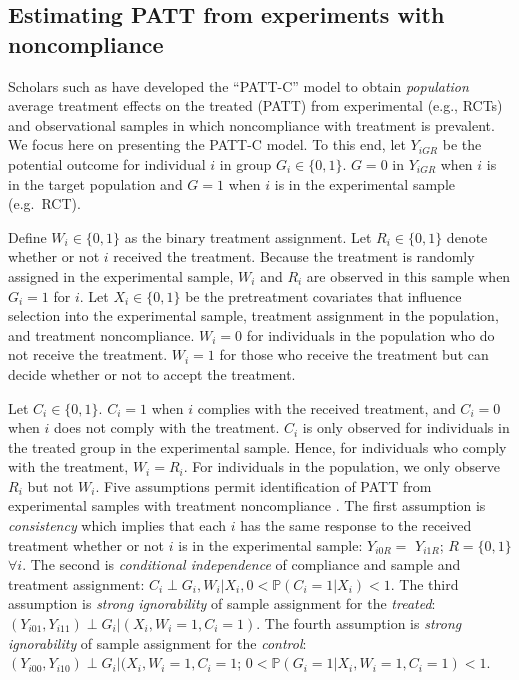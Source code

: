 \subsection{Estimating PATT from experiments with noncompliance}\label{estimating-patt-from-experiments-with-noncompliance}

Scholars such as \citet{ottoboni2020PATT} have developed the ``PATT-C'' model
to obtain \emph{population} average treatment effects on the treated (PATT)
from experimental (e.g., RCTs) and observational samples in which
noncompliance with treatment is prevalent. We focus here on presenting
the PATT-C model. To this end, let \(Y_{iGR}\) be the potential outcome
for individual \(i\) in group \(G_{i}\in\{0,1\}.\) \(G=0\) in \(Y_{iGR}\) when
\(i\) is in the target population and \(G=1\) when \(i\) is in the
experimental sample (e.g.~RCT).

Define \(W_{i}\in\{0,1\}\) as the binary treatment assignment. Let
\(R_{i}\in\{0,1\}\) denote whether or not \(i\) received the treatment.
Because the treatment is randomly assigned in the experimental sample,
\(W_{i}\) and \(R_{i}\) are observed in this sample when \(G_{i}=1\) for \(i\).
Let \(X_{i}\in\{0,1\}\) be the pretreatment covariates that influence
selection into the experimental sample, treatment assignment in the
population, and treatment noncompliance. \(W_{i}=0\) for individuals in
the population who do not receive the treatment. \(W_{i}=1\) for those who
receive the treatment but can decide whether or not to accept the
treatment.

Let \(C_{i}\in\{0,1\}\). \(C_{i}=1\) when \(i\) complies with the received
treatment, and \(C_{i}=0\) when \(i\) does not comply with the treatment.
\(C_{i}\) is only observed for individuals in the treated group in the
experimental sample. Hence, for individuals who comply with the
treatment, \(W_{i}=R_{i}\). For individuals in the population, we only
observe \(R_{i}\) but not \(W_{i}\). Five assumptions permit identification
of PATT from experimental samples with treatment noncompliance
\citep[ 110]{ottoboni2020PATT}. The first assumption is \emph{consistency} which
implies that each \(i\) has the same response to the received treatment
whether or not \(i\) is in the experimental sample: \(Y_{i0R}=\) \(Y_{i1R}\);
\(R=\{0,1\}\) \(\forall i.\) The second is \emph{conditional independence} of
compliance and sample and treatment assignment:
\(C_{i}\perp G_{i},W_{i}|X_{i}, 0<\mathbb{P}(C_{i}=1|X_{i})<1\). The third
assumption is \emph{strong ignorability} of sample assignment for the
\emph{treated}: \((Y_{i01},Y_{i11})\perp G_{i}|(X_{i},W_{i}=1,C_{i}=1)\). The
fourth assumption is \emph{strong ignorability} of sample assignment for the
\emph{control}: \((Y_{i00},Y_{i10})\perp G_{i}|(X_{i},W_{i}=1,C_{i}=1\);
\(0<\mathbb{P}(G_{i}=1|X_{i},W_{i}=1,C_{i}=1)<1\).

